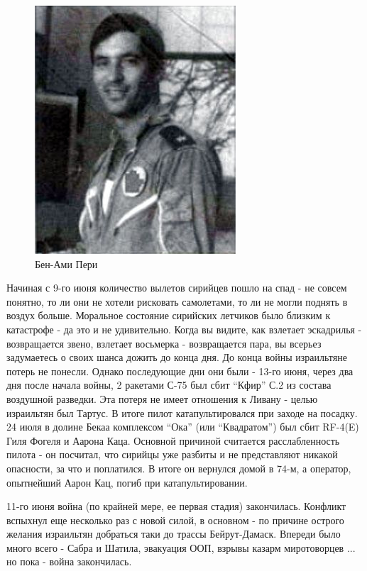 \begin{figure}[h!tb] 
	\centering\includegraphics[scale=0.5]{Bekaa_3/ETfLbaXXVqw.jpg}
	\caption{Бен-Ами Пери}%
\end{figure}

Начиная с 9-го июня количество вылетов сирийцев пошло на спад - не совсем понятно, то ли они не хотели рисковать самолетами, то ли не могли поднять в воздух больше. Моральное состояние сирийских летчиков было близким к катастрофе - да это и не удивительно. Когда вы видите, как взлетает эскадрилья - возвращается звено, взлетает восьмерка - возвращается пара, вы всерьез задумаетесь о своих шанса дожить до конца дня. До конца войны израильтяне потерь не понесли. Однако последующие дни они были - 13-го июня, через два дня после начала войны, 2 ракетами С-75 был сбит “Кфир” С.2 из состава воздушной разведки. Эта потеря не имеет отношения к Ливану - целью израильтян был Тартус. В итоге пилот катапультировался при заходе на посадку. 24 июля в долине Бекаа комплексом “Ока” (или “Квадратом”) был сбит RF-4(E) Гиля Фогеля и Аарона Каца. Основной причиной считается расслабленность пилота - он посчитал, что сирийцы уже разбиты и не представляют никакой опасности, за что и поплатился. В итоге он вернулся домой в 74-м, а оператор, опытнейший Аарон Кац, погиб при катапультировании.

11-го июня война (по крайней мере, ее первая стадия) закончилась. Конфликт вспыхнул еще несколько раз с новой силой, в основном - по причине острого желания израильтян добраться таки до трассы Бейрут-Дамаск. Впереди было много всего - Сабра и Шатила, эвакуация ООП, взрывы казарм миротоворцев ... но пока - война закончилась.


